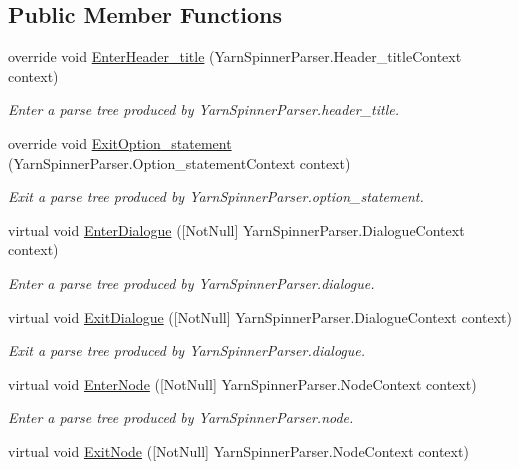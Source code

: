 \subsection*{Public Member Functions}
\begin{DoxyCompactItemize}
\item 
override void \hyperlink{a00109_a82f70aaca01b89ceb830d31c001f5666}{Enter\-Header\-\_\-title} (Yarn\-Spinner\-Parser.\-Header\-\_\-title\-Context context)
\begin{DoxyCompactList}\small\item\em Enter a parse tree produced by Yarn\-Spinner\-Parser.\-header\-\_\-title. \end{DoxyCompactList}\item 
override void \hyperlink{a00109_a3741704626660a81593bbede4fd07850}{Exit\-Option\-\_\-statement} (Yarn\-Spinner\-Parser.\-Option\-\_\-statement\-Context context)
\begin{DoxyCompactList}\small\item\em Exit a parse tree produced by Yarn\-Spinner\-Parser.\-option\-\_\-statement. \end{DoxyCompactList}\item 
virtual void \hyperlink{a00196_aaeec4ce9cbf5b95d429afab145b57953}{Enter\-Dialogue} (\mbox{[}Not\-Null\mbox{]} Yarn\-Spinner\-Parser.\-Dialogue\-Context context)
\begin{DoxyCompactList}\small\item\em Enter a parse tree produced by Yarn\-Spinner\-Parser.\-dialogue. \end{DoxyCompactList}\item 
virtual void \hyperlink{a00196_adb3910abdd76dca4b087ccbeda671cad}{Exit\-Dialogue} (\mbox{[}Not\-Null\mbox{]} Yarn\-Spinner\-Parser.\-Dialogue\-Context context)
\begin{DoxyCompactList}\small\item\em Exit a parse tree produced by Yarn\-Spinner\-Parser.\-dialogue. \end{DoxyCompactList}\item 
virtual void \hyperlink{a00196_a3729f55225c9447ae4add58d2d548917}{Enter\-Node} (\mbox{[}Not\-Null\mbox{]} Yarn\-Spinner\-Parser.\-Node\-Context context)
\begin{DoxyCompactList}\small\item\em Enter a parse tree produced by Yarn\-Spinner\-Parser.\-node. \end{DoxyCompactList}\item 
virtual void \hyperlink{a00196_a4a181214b03baf8e44df0d66e25d70f2}{Exit\-Node} (\mbox{[}Not\-Null\mbox{]} Yarn\-Spinner\-Parser.\-Node\-Context context)

\end{DoxyCompactItemize}
